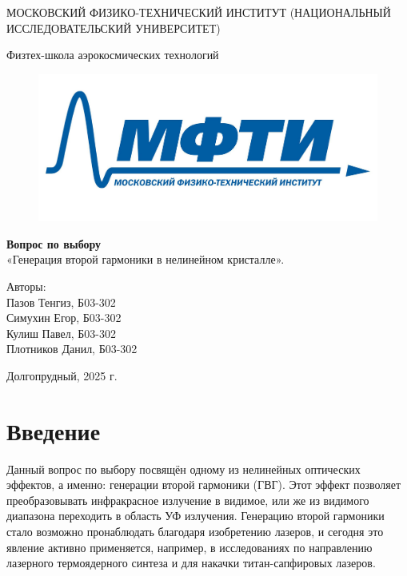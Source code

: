 \documentclass[a4paper,12pt]{article} %
\begin{document}
\begin{titlepage}
\begin{center}
{\large МОСКОВСКИЙ ФИЗИКО-ТЕХНИЧЕСКИЙ ИНСТИТУТ (НАЦИОНАЛЬНЫЙ ИССЛЕДОВАТЕЛЬСКИЙ УНИВЕРСИТЕТ)}
\end{center}
\begin{center}
{\large Физтех-школа аэрокосмических технологий}
\end{center}
\begin{figure}[H]
\centering
\includegraphics[scale=0.2]{MIPT.jpg}
\end{figure}

\vspace{3.0cm}
{\huge
\begin{center}
{\bf Вопрос по выбору}\\
«Генерация второй гармоники в нелинейном кристалле».
\end{center}
}
\vspace{4cm}
\begin{flushright}
{\LARGE Авторы:\\ Пазов Тенгиз, Б03-302 \\ Симухин Егор, Б03-302 \\ Кулиш Павел, Б03-302 \\ Плотников Данил, Б03-302}
\end{flushright}
\vspace{2.2cm}
\begin{center}
Долгопрудный, 2025 г.
\end{center}
\end{titlepage}

\newpage

\section{Введение}
Данный вопрос по выбору посвящён одному из нелинейных оптических эффектов, а именно: генерации второй гармоники (ГВГ). Этот эффект  позволяет преобразовывать инфракрасное излучение в видимое, или же из видимого диапазона переходить в область УФ излучения. Генерацию второй гармоники стало возможно пронаблюдать благодаря изобретению лазеров, и сегодня это явление активно применяется, например, в исследованиях по направлению лазерного термоядерного синтеза и для накачки титан-сапфировых лазеров. 
\end{document}
